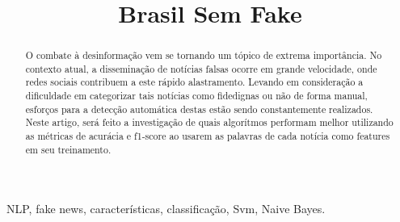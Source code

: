\documentclass[conference]{IEEEtran}
\begin{document}
\title{Brasil Sem Fake\\
}

\author{
\and
{}
\and
{}
\and
{}
}

\maketitle

\begin{abstract}
O combate à desinformação vem se tornando um tópico de extrema importância. No contexto atual, a disseminação de notícias falsas ocorre em grande velocidade, onde redes sociais contribuem a este rápido alastramento. Levando em consideração a dificuldade em categorizar tais notícias como fidedignas ou não de forma manual, esforços para a detecção automática destas estão sendo constantemente realizados. Neste artigo, será feito a investigação de quais algorítmos performam melhor utilizando as métricas de acurácia e f1-score ao usarem as palavras de cada notícia como features em seu treinamento.
\end{abstract}

\begin{IEEEkeywords}
NLP, fake news, características, classificação, Svm, Naive Bayes.
\end{IEEEkeywords}
\end{document}

